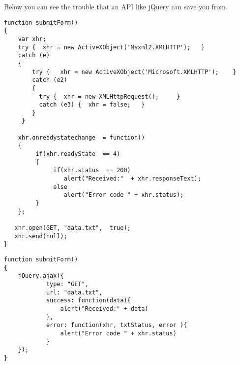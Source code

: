 Below you can see the trouble that an API like jQuery can save you from.
\lstset{language=Javascript}
\begin{lstlisting}[label=ajax,caption=Ajax without jQuery]
function submitForm()
{ 
    var xhr; 
    try {  xhr = new ActiveXObject('Msxml2.XMLHTTP');   }
    catch (e) 
    {
        try {   xhr = new ActiveXObject('Microsoft.XMLHTTP');    }
        catch (e2) 
        {
          try {  xhr = new XMLHttpRequest();     }
          catch (e3) {  xhr = false;   }
        }
     }
  
    xhr.onreadystatechange  = function()
    { 
         if(xhr.readyState  == 4)
         {
              if(xhr.status  == 200) 
                 alert("Received:"  + xhr.responseText); 
              else 
                 alert("Error code " + xhr.status);
         }
    }; 

   xhr.open(GET, "data.txt",  true); 
   xhr.send(null); 
} 
\end{lstlisting}
\lstset{language=Javascript}
\begin{lstlisting}[label=ajax-jQuery,caption=Ajax with jQuery]
function submitForm()
{ 
    jQuery.ajax({
			type: "GET",
			url: "data.txt",
			success: function(data){
				alert("Received:" + data)
			},
			error: function(xhr, txtStatus, error ){
				alert("Error code " + xhr.status)	
			}    
    });
} 
\end{lstlisting}